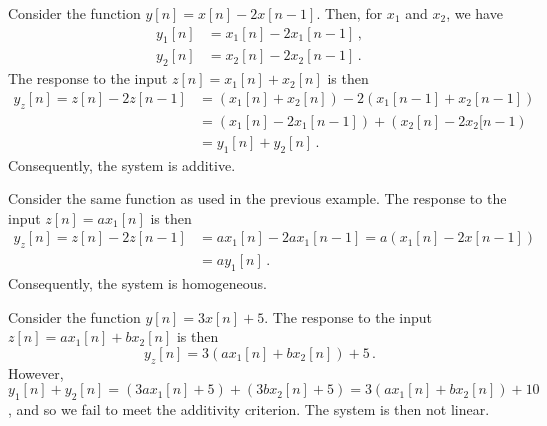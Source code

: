 \begin{exmp}
  Consider the function $y[n] = x[n] - 2x[n-1]$. Then, for $x_1$ and $x_2$, we have
  \begin{align*}
    y_1[n] &= x_1[n] - 2x_1[n-1] \,, \\
    y_2[n] &= x_2[n] - 2x_2[n-1] \,.
  \end{align*}
  The response to the input $z[n] = x_1[n] + x_2[n]$ is then
  \begin{align*}
    y_z[n] = z[n] - 2z[n-1] &= (x_1[n] + x_2[n]) - 2(x_1[n-1] + x_2[n-1]) \\
    &= (x_1[n] - 2x_1[n-1]) + (x_2[n] - 2x_2[n-1) \\
    &= y_1[n] + y_2[n] \,.
  \end{align*}
  Consequently, the system is additive.
\end{exmp}
%
\begin{exmp}
  Consider the same function as used in the previous example. The response to the
  input $z[n] = ax_1[n]$ is then
  \begin{align*}
    y_z[n] = z[n] - 2z[n-1] &= ax_1[n] - 2ax_1[n-1] = a(x_1[n] - 2x[n-1]) \\
    &= ay_1[n] \,.
  \end{align*}
  Consequently, the system is homogeneous.
\end{exmp}
%
\begin{exmp}
  Consider the function $y[n] = 3x[n] + 5$. The response to the input
  $z[n] = ax_1[n] + bx_2[n]$ is then
  \begin{displaymath}
    y_z[n] = 3(ax_1[n] + bx_2[n]) + 5 \,.
  \end{displaymath}
  However, $y_1[n] + y_2[n] = (3ax_1[n] + 5) + (3bx_2[n] + 5) = 3(ax_1[n] + bx_2[n]) + 10$,
  and so we fail to meet the additivity criterion. The system is then not linear.
\end{exmp}

